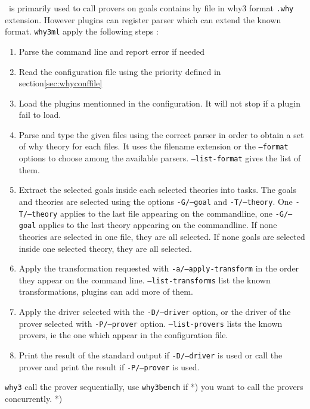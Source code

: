 \why\ is primarily used to call provers on goals contains by file in
why3 format \texttt{.why} extension. However plugins can register
parser which can extend the known format. \texttt{why3ml} apply the
following steps :
\begin{enumerate}
\item Parse the command line and report error if needed
\item Read the configuration file using the priority defined in
  section\ref{sec:whyconffile}
\item Load the plugins mentionned in the configuration. It will not
  stop if a plugin fail to load.
\item Parse and type the given files using the correct parser in order
  to obtain a set of why theory for each files. It uses
  the filename extension or the \texttt{--format} options to choose
  among the available parsers. \texttt{--list-format} gives the list
  of them.
\item Extract the selected goals inside each selected theories into
  tasks. The goals and theories are selected using the options
  \texttt{-G/--goal} and \texttt{-T/--theory}. One
  \texttt{-T/--theory} applies to the last file appearing on the
  commandline, one \texttt{-G/--goal} applies to the last theory
  appearing on the commandline. If none theories are selected in one
  file, they are all selected. If none goals are selected inside one
  selected theory, they are all selected.
\item Apply the transformation requested
  with \texttt{-a/--apply-transform} in the order they appear on the
  command line. \texttt{--list-transforms} list the known
  transformations, plugins can add more of them.
\item Apply the driver selected with the \texttt{-D/--driver} option,
  or the driver of the prover selected with \texttt{-P/--prover}
  option. \texttt{--list-provers} lists the known provers, ie the one
  which appear in the configuration file.
\item Print the result of the standard output if \texttt{-D/--driver}
  is used or call the prover and print the result if
  \texttt{-P/--prover} is used.
\end{enumerate}

\texttt{why3} call the prover sequentially, use \texttt{why3bench} if *)
you want to call the provers concurrently.  *)

